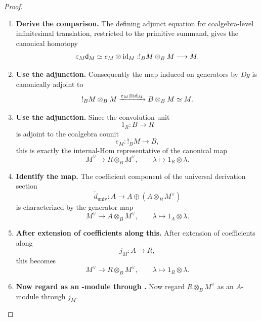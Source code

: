 \begin{proof}
\begin{enumerate}[label=\textup{(\arabic*)}]
    \item \textbf{Derive the comparison.}
    The defining adjunct equation for coalgebra-level infinitesimal translation, restricted to
    the primitive summand, gives the canonical homotopy
    \[
            \varepsilon_M\mathsf d_M
            \simeq
            e_M\otimes\operatorname{id}_M:
            !_BM\otimes_BM\longrightarrow M.
        \]

    \item \textbf{Use the adjunction.}
    Consequently the map induced on generators by \(Dg\) is canonically adjoint to
    \[
            !_BM\otimes_BM
            \xrightarrow{e_M\otimes\operatorname{id}_M}
            B\otimes_BM
            \simeq
            M.
        \]

    \item \textbf{Use the adjunction.}
    Since the convolution unit
    \[
            1_R:B\longrightarrow R
        \]
    is adjoint to the coalgebra counit
    \[
            e_M:!_BM\longrightarrow B,
        \]
    this is exactly the internal-Hom representative of the canonical map
    \[
            M^\vee
            \longrightarrow
            R\otimes_BM^\vee,
            \qquad
            \lambda\longmapsto1_R\otimes\lambda.
        \]

    \item \textbf{Identify the map.}
    The coefficient component of the universal derivation section
    \[
            \widetilde d_{\mathrm{univ}}:
            A
            \longrightarrow
            A\oplus(A\otimes_BM^\vee)
        \]
    is characterized by the generator map
    \[
            M^\vee
            \longrightarrow
            A\otimes_BM^\vee,
            \qquad
            \lambda\longmapsto1_A\otimes\lambda.
        \]

    \item \textbf{After extension of coefficients along this.}
    After extension of coefficients along
    \[
            j_M:A\longrightarrow R,
        \]
    this becomes
    \[
            M^\vee
            \longrightarrow
            R\otimes_BM^\vee,
            \qquad
            \lambda\longmapsto1_R\otimes\lambda.
        \]

    \item \textbf{Now regard as an -module through .}
    Now regard \(R\otimes_BM^\vee\) as an \(A\)-module through \(j_M\).


\end{enumerate}
\end{proof}
